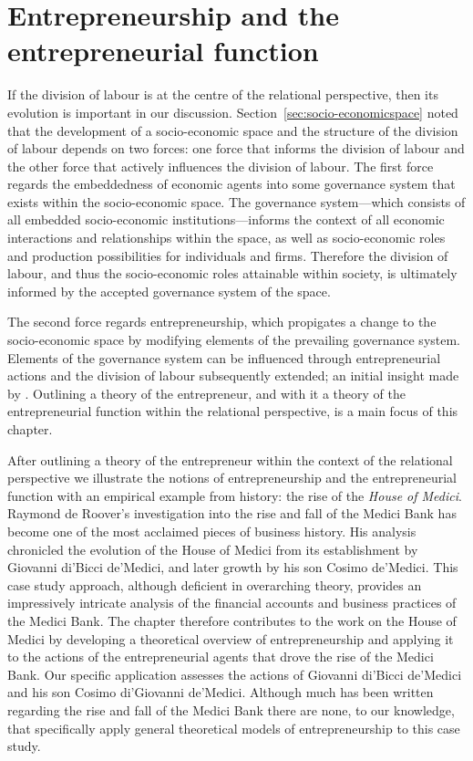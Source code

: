 \chapter{Entrepreneurship and the entrepreneurial function} 
\label{ch:entrepreneurship}

If the division of labour is at the centre of the relational perspective, then its evolution is important in our discussion. Section~\ref{sec:socio-economicspace} noted that the development of a socio-economic space and the structure of the division of labour depends on two forces: one force that informs the division of labour and the other force that actively influences the division of labour. The first force regards the embeddedness of economic agents into some governance system that exists within the socio-economic space. The governance system---which consists of all embedded socio-economic institutions---informs the context of all economic interactions and relationships within the space, as well as socio-economic roles and production possibilities for individuals and firms. Therefore the division of labour, and thus the socio-economic roles attainable within society, is ultimately informed by the accepted governance system of the space. 

The second force regards entrepreneurship, which propigates a change to the socio-economic space by modifying elements of the prevailing governance system. Elements of the governance system can be influenced through entrepreneurial actions and the division of labour subsequently extended; an initial insight made by \citet{Smith1776}. Outlining a theory of the entrepreneur, and with it a theory of the entrepreneurial function within the relational perspective, is a main focus of this chapter.

After outlining a theory of the entrepreneur within the context of the relational perspective we illustrate the notions of entrepreneurship and the entrepreneurial function with an empirical example from history: the rise of the \emph{House of Medici}. Raymond de Roover's investigation into the rise and fall of the Medici Bank has become one of the most acclaimed pieces of business history. His analysis chronicled the evolution of the House of Medici from its establishment by Giovanni di'Bicci de'Medici, and later growth by his son Cosimo de'Medici. This case study approach, although deficient in overarching theory, provides an impressively intricate analysis of the financial accounts and business practices of the Medici Bank. The chapter therefore contributes to the work on the House of Medici by developing a theoretical overview of entrepreneurship and applying it to the actions of the entrepreneurial agents that drove the rise of the Medici Bank. Our specific application assesses the actions of Giovanni di'Bicci de'Medici and his son Cosimo di'Giovanni de'Medici. Although much has been written regarding the rise and fall of the Medici Bank there are none, to our knowledge, that specifically apply general theoretical models of entrepreneurship to this case study.

